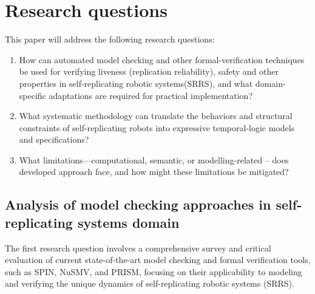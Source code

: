 
\chapter{Research questions} \label{research_questions}


This paper will address the following research questions:
\begin{enumerate}
    \item How can automated model checking and other formal-verification 
        techniques be used for verifying liveness (replication reliability),
        safety and other properties in self-replicating robotic systems(SRRS), 
        and what domain-specific adaptations are required for practical implementation?
    \item What systematic methodology can translate the behaviors and 
        structural constraints of self-replicating robots into expressive 
        temporal-logic models and specifications?
    \item What limitations—computational, semantic, or 
        modelling-related -- does developed approach face, and how might these limitations be mitigated?
\end{enumerate}


\section{Analysis of model checking approaches in self-replicating systems domain}

%
%
The first research question involves a comprehensive survey and critical 
evaluation of current state-of-the-art model checking and formal verification 
tools, such as SPIN, NuSMV, and PRISM, focusing on their applicability to modeling 
and verifying the unique dynamics of self-replicating robotic systems (SRRS). 


